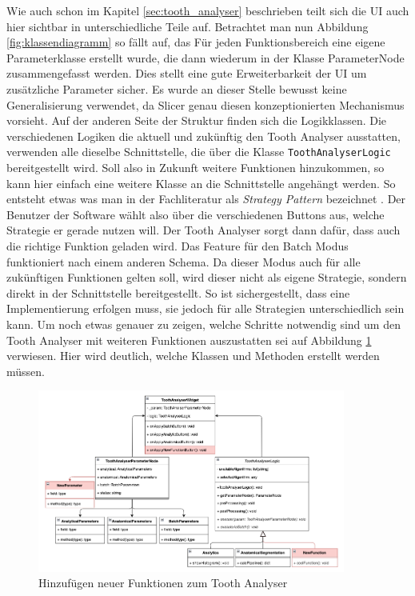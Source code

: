 Wie auch schon im Kapitel \ref{sec:tooth_analyser} beschrieben teilt sich die
\ac{UI} auch hier sichtbar in unterschiedliche Teile auf. Betrachtet man nun
Abbildung \ref{fig:klassendiagramm} so fällt auf, das Für jeden Funktionsbereich
eine eigene Parameterklasse erstellt wurde, die dann wiederum in der Klasse
ParameterNode zusammengefasst werden. Dies stellt eine gute Erweiterbarkeit der \ac{UI}
um zusätzliche Parameter sicher. Es wurde an dieser Stelle bewusst keine Generalisierung
verwendet, da Slicer genau diesen konzeptionierten Mechanismus vorsieht. Auf der
anderen Seite der Struktur finden sich die Logikklassen. Die verschiedenen
Logiken die aktuell und zukünftig den Tooth Analyser ausstatten, verwenden alle dieselbe
Schnittstelle, die über die Klasse \texttt{ToothAnalyserLogic} bereitgestellt wird.
Soll also in Zukunft weitere Funktionen hinzukommen, so kann hier einfach eine weitere
Klasse an die Schnittstelle angehängt werden. So entsteht etwas was man in der
Fachliteratur als \textit{Strategy Pattern} bezeichnet \citep[vgl.][S. 99]{siebler2014}.
Der Benutzer der Software wählt also über die verschiedenen Buttons aus, welche
Strategie er gerade nutzen will. Der Tooth Analyser sorgt dann dafür, dass auch
die richtige Funktion geladen wird. Das Feature für den Batch Modus funktioniert
nach einem anderen Schema. Da dieser Modus auch für alle zukünftigen Funktionen
gelten soll, wird dieser nicht als eigene Strategie, sondern direkt in der
Schnittstelle bereitgestellt. So ist sichergestellt, dass eine Implementierung
erfolgen muss, sie jedoch für alle Strategien unterschiedlich sein kann. Um noch
etwas genauer zu zeigen, welche Schritte notwendig sind um den Tooth Analyser mit
weiteren Funktionen auszustatten sei auf Abbildung \ref{fig:klassendiagramm_new}
verwiesen. Hier wird deutlich, welche Klassen und Methoden erstellt werden müssen.

\begin{figure}[h]
	\centering
	\includegraphics[width=0.9\textwidth]{
		img/tooth_analyser_class_diagram_new.png
	}
	\caption{Hinzufügen neuer Funktionen zum Tooth Analyser}
	\label{fig:klassendiagramm_new}
\end{figure}

